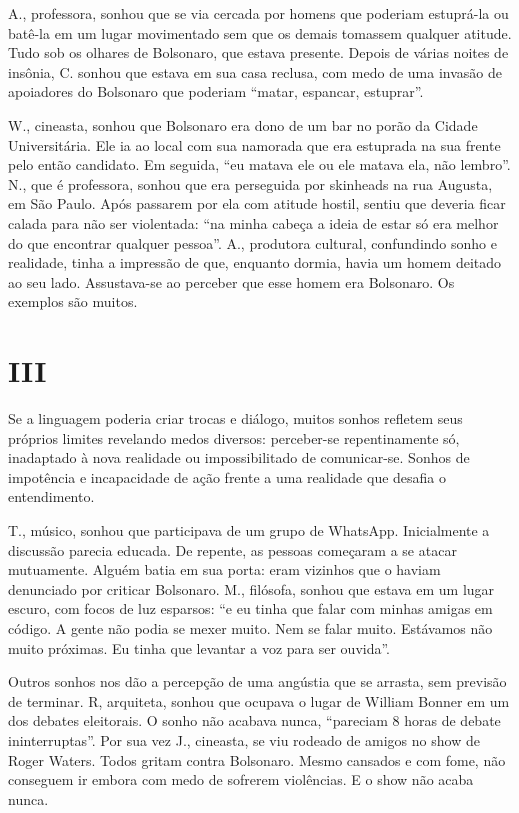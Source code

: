 A., professora, sonhou que se via cercada por homens que poderiam
estuprá-la ou batê-la em um lugar movimentado sem que os demais tomassem
qualquer atitude. Tudo sob os olhares de Bolsonaro, que estava presente.
Depois de várias noites de insônia, C. sonhou que estava em sua casa
reclusa, com medo de uma invasão de apoiadores do Bolsonaro que poderiam
``matar, espancar, estuprar''.

W., cineasta, sonhou que Bolsonaro era dono de um bar no porão da Cidade
Universitária. Ele ia ao local com sua namorada que era estuprada na sua
frente pelo então candidato. Em seguida, ``eu matava ele ou ele matava
ela, não lembro''. N., que é professora, sonhou que era perseguida por
skinheads na rua Augusta, em São Paulo. Após passarem por ela com
atitude hostil, sentiu que deveria ficar calada para não ser violentada:
``na minha cabeça a ideia de estar só era melhor do que encontrar
qualquer pessoa''. A., produtora cultural, confundindo sonho e
realidade, tinha a impressão de que, enquanto dormia, havia um homem
deitado ao seu lado. Assustava-se ao perceber que esse homem era
Bolsonaro. Os exemplos são muitos.

\section*{III}

Se a linguagem poderia criar trocas e diálogo, muitos sonhos refletem
seus próprios limites revelando medos diversos: perceber-se
repentinamente só, inadaptado à nova realidade ou impossibilitado de
comunicar-se. Sonhos de impotência e incapacidade de ação frente a uma
realidade que desafia o entendimento.

T., músico, sonhou que participava de um grupo de WhatsApp. Inicialmente
a discussão parecia educada. De repente, as pessoas começaram a se
atacar mutuamente. Alguém batia em sua porta: eram vizinhos que o haviam
denunciado por criticar Bolsonaro. M., filósofa, sonhou que estava em um
lugar escuro, com focos de luz esparsos: ``e eu tinha que falar com
minhas amigas em código. A gente não podia se mexer muito. Nem se falar
muito. Estávamos não muito próximas. Eu tinha que levantar a voz para
ser ouvida''.

Outros sonhos nos dão a percepção de uma angústia que se arrasta, sem
previsão de terminar. R, arquiteta, sonhou que ocupava o lugar de William
Bonner em um dos debates eleitorais. O sonho não acabava nunca,
``pareciam 8 horas de debate ininterruptas''. Por sua vez J., cineasta,
se viu rodeado de amigos no show de Roger Waters. Todos gritam contra
Bolsonaro. Mesmo cansados e com fome, não conseguem ir embora com medo
de sofrerem violências. E o show não acaba nunca.

